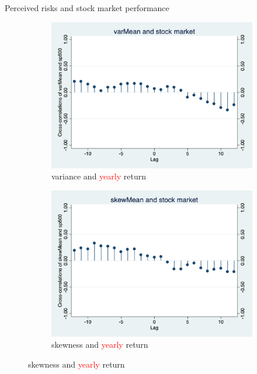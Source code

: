 \documentclass{beamer}
\begin{document}
\begin{frame}{Perceived risks and stock market performance}
	\begin{figure}
		\centering
		\label{corr_stk}
		\begin{subfigure}[b]{0.45\textwidth}
			\centering
			\caption{variance and \textcolor{red}{yearly} return}
			\includegraphics[width=\textwidth]{figures/corr_varMean_stk}
		\end{subfigure}
		\begin{subfigure}[b]{0.45\textwidth}
			\centering
			\caption{skewness and \textcolor{red}{yearly} return}
			\includegraphics[width=\textwidth]{figures/corr_skewMean_stk}
		\end{subfigure}
	\end{figure}
\end{frame}
\end{document}
